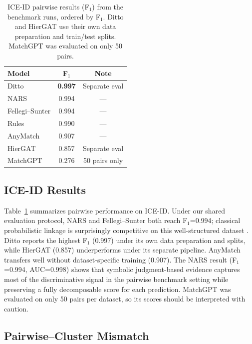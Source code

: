 \documentclass{article}
\begin{document}
\begin{table}[H]
  \centering
  \small
  \caption{ICE-ID pairwise results (F$_1$) from the benchmark runs, ordered by F$_1$. Ditto and HierGAT use their own data preparation and train/test splits. MatchGPT was evaluated on only 50 pairs.}
  \label{tab:iceid_results}
  \begin{tabular}{lcc}
    \toprule
    \textbf{Model} & \textbf{F$_1$} & \textbf{Note} \\
    \midrule
    Ditto & \textbf{0.997} & Separate eval \\
    NARS & 0.994 & --- \\
    Fellegi--Sunter & 0.994 & --- \\
    Rules & 0.990 & --- \\
    AnyMatch & 0.907 & --- \\
    HierGAT & 0.857 & Separate eval \\
    MatchGPT & 0.276 & 50 pairs only \\
    \bottomrule
  \end{tabular}
\end{table}

\subsection{ICE-ID Results}\label{sec:NARSResults}

Table~\ref{tab:iceid_results} summarizes pairwise performance on ICE-ID. Under our shared evaluation protocol, NARS and Fellegi--Sunter both reach F$_1$=0.994; classical probabilistic linkage is surprisingly competitive on this well-structured dataset \cite{fellegi1969theory, Sayers2015ProbabilisticRL, Newcombe1959AutomaticLO}. Ditto reports the highest F$_1$ (0.997) under its own data preparation and splits, while HierGAT (0.857) underperforms under its separate pipeline. AnyMatch transfers well without dataset-specific training (0.907). The NARS result (F$_1$=0.994, AUC=0.998) shows that symbolic judgment-based evidence captures most of the discriminative signal in the pairwise benchmark setting while preserving a fully decomposable score for each prediction. MatchGPT was evaluated on only 50 pairs per dataset, so its scores should be interpreted with caution.

\subsection{Pairwise--Cluster Mismatch}
\label{sec:sanity_checks}
\end{document}
